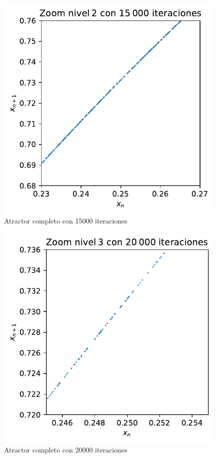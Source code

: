 \documentclass[
  10pt,
  a4paper,
  DIV=11,
  numbers=noendperiod,
  open=any]{scrreprt}
\numberwithin{equation}{chapter}
\numberwithin{equation}{section}
\renewcommand{\[}{\begin{equation}}
\renewcommand{\]}{\end{equation}}
\begin{document}
\begin{figure}[h]
  \centering
  \includegraphics[width=0.99\textwidth]{04-clima/atractor_files/figure-pdf/cell-6-output-3.pdf}
  \caption{Atractor completo con 15000 iteraciones}
\end{figure}

\begin{figure}[h]
  \centering
  \includegraphics[width=0.99\textwidth]{04-clima/atractor_files/figure-pdf/cell-6-output-4.pdf}
  \caption{Atractor completo con 20000 iteraciones}
\end{figure}
\end{document}
